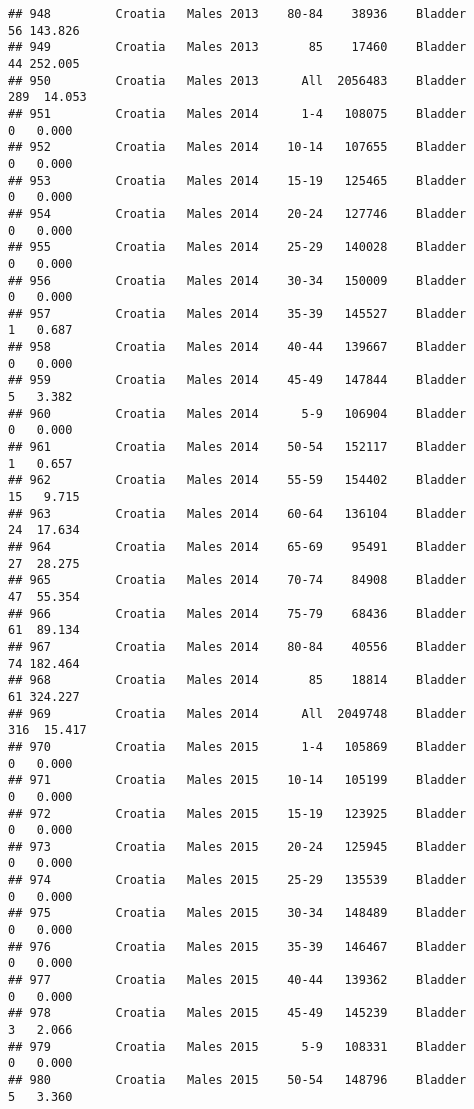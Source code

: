\documentclass[
]{article}
\begin{document}
\begin{verbatim}
## 948         Croatia   Males 2013    80-84    38936    Bladder     56 143.826
## 949         Croatia   Males 2013       85    17460    Bladder     44 252.005
## 950         Croatia   Males 2013      All  2056483    Bladder    289  14.053
## 951         Croatia   Males 2014      1-4   108075    Bladder      0   0.000
## 952         Croatia   Males 2014    10-14   107655    Bladder      0   0.000
## 953         Croatia   Males 2014    15-19   125465    Bladder      0   0.000
## 954         Croatia   Males 2014    20-24   127746    Bladder      0   0.000
## 955         Croatia   Males 2014    25-29   140028    Bladder      0   0.000
## 956         Croatia   Males 2014    30-34   150009    Bladder      0   0.000
## 957         Croatia   Males 2014    35-39   145527    Bladder      1   0.687
## 958         Croatia   Males 2014    40-44   139667    Bladder      0   0.000
## 959         Croatia   Males 2014    45-49   147844    Bladder      5   3.382
## 960         Croatia   Males 2014      5-9   106904    Bladder      0   0.000
## 961         Croatia   Males 2014    50-54   152117    Bladder      1   0.657
## 962         Croatia   Males 2014    55-59   154402    Bladder     15   9.715
## 963         Croatia   Males 2014    60-64   136104    Bladder     24  17.634
## 964         Croatia   Males 2014    65-69    95491    Bladder     27  28.275
## 965         Croatia   Males 2014    70-74    84908    Bladder     47  55.354
## 966         Croatia   Males 2014    75-79    68436    Bladder     61  89.134
## 967         Croatia   Males 2014    80-84    40556    Bladder     74 182.464
## 968         Croatia   Males 2014       85    18814    Bladder     61 324.227
## 969         Croatia   Males 2014      All  2049748    Bladder    316  15.417
## 970         Croatia   Males 2015      1-4   105869    Bladder      0   0.000
## 971         Croatia   Males 2015    10-14   105199    Bladder      0   0.000
## 972         Croatia   Males 2015    15-19   123925    Bladder      0   0.000
## 973         Croatia   Males 2015    20-24   125945    Bladder      0   0.000
## 974         Croatia   Males 2015    25-29   135539    Bladder      0   0.000
## 975         Croatia   Males 2015    30-34   148489    Bladder      0   0.000
## 976         Croatia   Males 2015    35-39   146467    Bladder      0   0.000
## 977         Croatia   Males 2015    40-44   139362    Bladder      0   0.000
## 978         Croatia   Males 2015    45-49   145239    Bladder      3   2.066
## 979         Croatia   Males 2015      5-9   108331    Bladder      0   0.000
## 980         Croatia   Males 2015    50-54   148796    Bladder      5   3.360

\end{verbatim}
\end{document}
